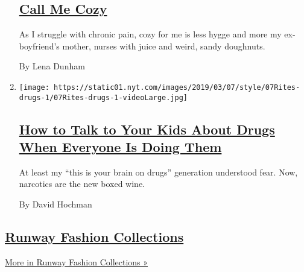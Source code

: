 \begin{enumerate}
  \hypertarget{call-me-cozy}{%
  \subsection{\texorpdfstring{\href{/2019/03/14/style/lena-dunham-cozy.html}{Call
  Me Cozy}}{Call Me Cozy}}\label{call-me-cozy}}

  As I struggle with chronic pain, cozy for me is less hygge and more my
  ex-boyfriend's mother, nurses with juice and weird, sandy doughnuts.

  By Lena Dunham
\item
  \texttt{[image: https://static01.nyt.com/images/2019/03/07/style/07Rites-drugs-1/07Rites-drugs-1-videoLarge.jpg]}

  \hypertarget{how-to-talk-to-your-kids-about-drugs-when-everyone-is-doing-them}{%
  \subsection{\texorpdfstring{\href{/2019/03/07/style/how-to-talk-to-your-kids-about-drugs-when-everyone-is-doing-them.html}{How
  to Talk to Your Kids About Drugs When Everyone Is Doing
  Them}}{How to Talk to Your Kids About Drugs When Everyone Is Doing Them}}\label{how-to-talk-to-your-kids-about-drugs-when-everyone-is-doing-them}}

  At least my ``this is your brain on drugs'' generation understood
  fear. Now, narcotics are the new boxed wine.

  By David Hochman
\end{enumerate}

\hypertarget{runway-fashion-collections}{%
\subsection{\texorpdfstring{\href{/spotlight/fashion-runway-slideshows}{Runway
Fashion
Collections}}{Runway Fashion Collections}}\label{runway-fashion-collections}}

\href{/spotlight/fashion-runway-slideshows}{More in Runway Fashion
Collections »}

